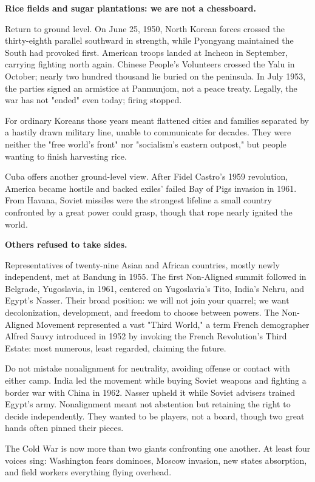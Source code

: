 \textbf{Rice fields and sugar plantations: we are not a chessboard.}

Return to ground level. On June 25, 1950, North Korean forces crossed the thirty-eighth parallel southward in strength, while Pyongyang maintained the South had provoked first. American troops landed at Incheon in September, carrying fighting north again. Chinese People's Volunteers crossed the Yalu in October; nearly two hundred thousand lie buried on the peninsula. In July 1953, the parties signed an armistice at Panmunjom, not a peace treaty. Legally, the war has not "ended" even today; firing stopped.

For ordinary Koreans those years meant flattened cities and families separated by a hastily drawn military line, unable to communicate for decades. They were neither the "free world's front" nor "socialism's eastern outpost," but people wanting to finish harvesting rice.

Cuba offers another ground-level view. After Fidel Castro's 1959 revolution, America became hostile and backed exiles' failed Bay of Pigs invasion in 1961. From Havana, Soviet missiles were the strongest lifeline a small country confronted by a great power could grasp, though that rope nearly ignited the world.

\textbf{Others refused to take sides.}

Representatives of twenty-nine Asian and African countries, mostly newly independent, met at Bandung in 1955. The first Non-Aligned summit followed in Belgrade, Yugoslavia, in 1961, centered on Yugoslavia's Tito, India's Nehru, and Egypt's Nasser. Their broad position: we will not join your quarrel; we want decolonization, development, and freedom to choose between powers. The Non-Aligned Movement represented a vast "Third World," a term French demographer Alfred Sauvy introduced in 1952 by invoking the French Revolution's Third Estate: most numerous, least regarded, claiming the future.

Do not mistake nonalignment for neutrality, avoiding offense or contact with either camp. India led the movement while buying Soviet weapons and fighting a border war with China in 1962. Nasser upheld it while Soviet advisers trained Egypt's army. Nonalignment meant not abstention but retaining the right to decide independently. They wanted to be players, not a board, though two great hands often pinned their pieces.

The Cold War is now more than two giants confronting one another. At least four voices sing: Washington fears dominoes, Moscow invasion, new states absorption, and field workers everything flying overhead.


